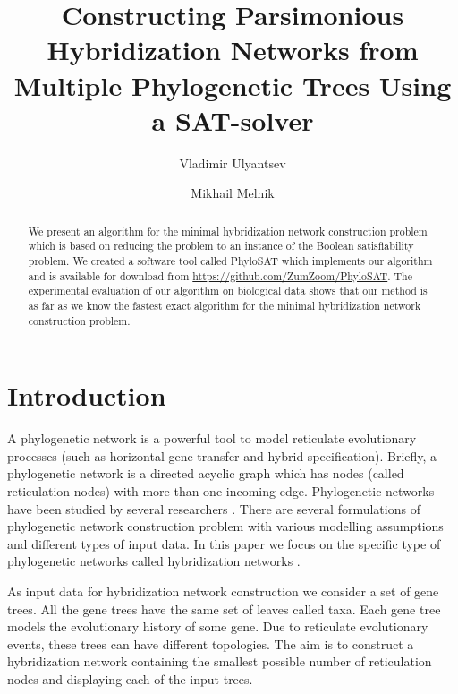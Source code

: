 \documentclass[runningheads, envcountsame, a4paper]{llncs}
\begin{document}
\mainmatter           
\title{Constructing Parsimonious Hybridization Networks from Multiple Phylogenetic Trees Using a SAT-solver}
\titlerunning{ } 
\toctitle{ }

\author{Vladimir Ulyantsev \and Mikhail Melnik}

\maketitle
\setcounter{footnote}{0}

\begin{abstract}
  We present an algorithm for the minimal hybridization network construction problem which is based on reducing 
  the problem to an instance of the Boolean satisfiability problem. We created a software tool called PhyloSAT  
  which implements our algorithm and is available for download from \url{https://github.com/ZumZoom/PhyloSAT}.
  The experimental evaluation of our algorithm on biological data shows that our method is as far as we know the 
  fastest exact algorithm for the minimal hybridization network construction problem.

\end{abstract}

\section{Introduction}

A phylogenetic network is a powerful tool to model reticulate
evolutionary processes (such as horizontal gene transfer and hybrid specification).
Briefly, a phylogenetic network is a directed acyclic graph which has
nodes (called reticulation nodes) with more than one incoming edge. Phylogenetic
networks have been studied by several researchers \cite{huson2010phylogenetic, morrison2011introduction, 
nakhleh2011evolutionary}. There are several formulations of phylogenetic network
construction problem with various modelling assumptions and different types of input data. 
In this paper we focus on the specific type of phylogenetic networks called hybridization
networks \cite{semple2006hybridization, chen2010hybridnet}.

As input data for hybridization network construction we consider a set of gene trees. 
All the gene trees have the same set of leaves called taxa.
Each gene tree models the evolutionary history of some gene. 
Due to reticulate evolutionary events, these trees can have different topologies.
The aim is to construct a hybridization network containing the smallest possible number of 
reticulation nodes and displaying each of the input trees. 
\end{document}
